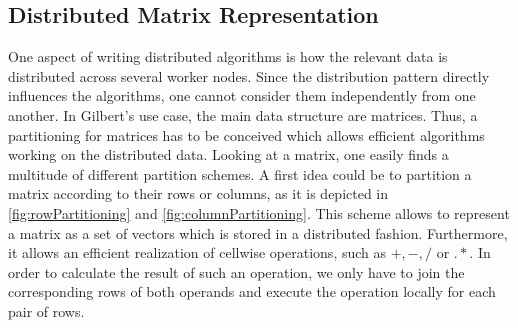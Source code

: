 \subsection{Distributed Matrix Representation}
\label{sec:DistributedMatrixRepresentation}

One aspect of writing distributed algorithms is how the relevant data is distributed across several worker nodes. Since the distribution pattern directly influences the algorithms, one cannot consider them independently from one another. In Gilbert's use case, the main data structure are matrices. Thus, a partitioning for matrices has to be conceived which allows efficient algorithms working on the distributed data. Looking at a matrix, one easily finds a multitude of different partition schemes. A first idea could be to partition a matrix according to their rows or columns, as it is depicted in \cref{fig:rowPartitioning} and \cref{fig:columnPartitioning}. This scheme allows to represent a matrix as a set of vectors which is stored in a distributed fashion.
Furthermore, it allows an efficient realization of cellwise operations, such as $+,-,/$ or $.*$. In order to calculate the result of such an operation, we only have to join the corresponding rows of both operands and execute the operation locally for each pair of rows.

